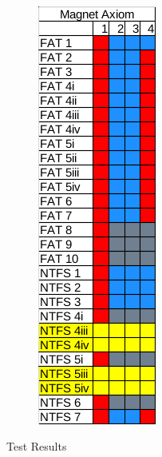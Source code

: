 \begin{figure}[h!]
\begin{subfigure}{0.3\linewidth}
    \end{subfigure}
    ~
    \begin{subfigure}{0.3\linewidth}
        \includegraphics[width=\linewidth]{fig/axiom_results.png}
    \end{subfigure}
    
    \caption{Test Results}
    \label{fig:results}
\end{figure}

